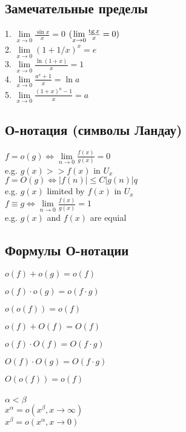 \subsection{Замечательные пределы}

1. $ \lim\limits_{x\to 0} \frac{\sin{x}}{x} = 0$ $ (\lim\limits_{x\to 0} \frac{\operatorname{tg}{x}}{x} = 0) $ \\
2. $ \lim\limits_{x\to 0} (1 + 1/x)^x = e $ \\
3. $ \lim\limits_{x\to 0} \frac{\ln{(1+x)}}{x} = 1 $ \\
4. $ \lim\limits_{x\to 0} \frac{a^x + 1}{x} = \ln{a} $ \\
5. $ \lim\limits_{x\to 0} \frac{(1 + x)^a - 1}{x} = a $ \\

\subsection{О-нотация (символы Ландау)}

$f = o(g) \Leftrightarrow \lim\limits_{n \to 0} \frac{f(x)}{g(x)} = 0$ \\
e.g. $g(x) >> f(x)$ in $U_x$ \\

$f = O(g) \Leftrightarrow |f(n)| \le C|g(n)|q $ \\
e.g. $g(x) $ limited by $ f(x)$ in $U_x$ \\

$f \equiv g \Leftrightarrow \lim\limits_{n \to 0} \frac{f(x)}{g(x)} = 1 $ \\
e.g. $g(x)$ and $f(x)$ are equial \\

\subsection{Формулы О-нотации}

$o(f)+o(g) = o(f)$

$o(f) \cdot o(g) = o(f \cdot g)$

$o(o(f)) = o(f)$

$o(f)+O(f) = O(f)$

$o(f) \cdot O(f) = O(f \cdot g)$

$O(f) \cdot O(g) = O(f \cdot g)$

$O(o(f)) = o(f)$ \\\\

$ \alpha < \beta $ \\
$x^{\alpha} = o(x^{\beta}, x\to \infty ) $ \\
$x^{\beta} = o(x^{\alpha}, x\to 0 )$ \\

